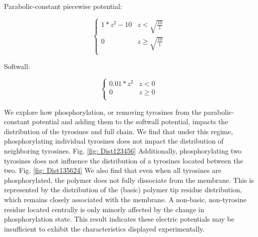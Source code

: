 \documentclass[../../AdvancementSummary.tex]{subfiles}
\begin{document}
Parabolic-constant piecewise potential:

\begin{equation}\label{eq: parabolaconstant}
\begin{cases}
1*z^2-10 	& z<\sqrt{\frac{10}{1}}\\
0 & z \geq \sqrt{\frac{10}{1}} \\
\end{cases}
\end{equation}


Softwall:

\begin{equation}\label{eq: softwall}
\begin{cases}
0.01*z^2 	& z < 0\\
0 & z \geq 0 \\
\end{cases}
\end{equation}

We explore how phosphorylation, or removing tyrosines from the parabolic-constant potential and adding them to the softwall potential, impacts the distribution of the tyrosines and full chain. We find that under this regime, phosphorylating individual tyrosines does not impact the distribution of neighboring tyrosines. Fig. \ref{fig: Dist123456} Additionally, phosphorylating two tyrosines does not influence the distribution of a tyrosines located between the two. Fig. \ref{fig: Dist135624} We also find that even when all tyrosines are phosphorylated, the polymer does not fully dissociate from the membrane. This is represented by the distribution of the (basic) polymer tip residue distribution, which remains closely associated with the membrane. A non-basic, non-tyrosine residue located centrally is only minorly affected by the change in phosphorylation state. This result indicates these electric potentials may be insufficient to exhibit the characteristics displayed experimentally.
\end{document}

